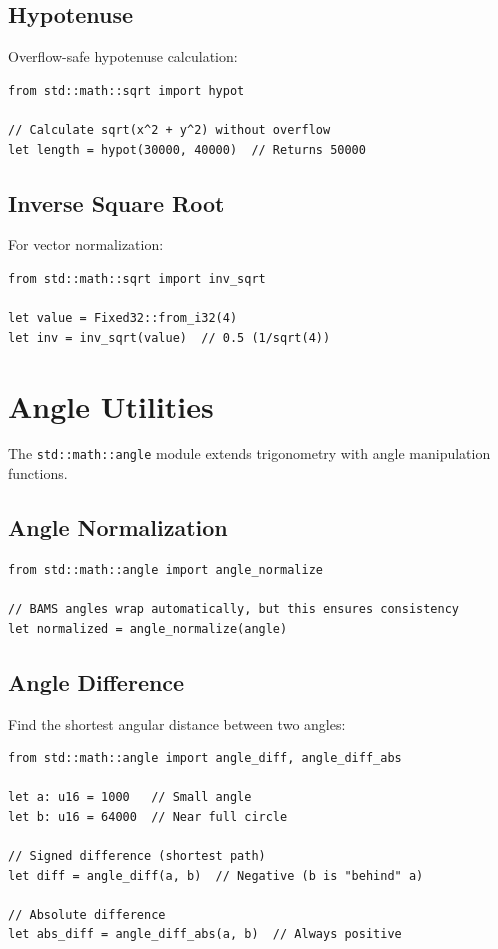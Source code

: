 \subsection{Hypotenuse}

Overflow-safe hypotenuse calculation:

\begin{lstlisting}
from std::math::sqrt import hypot

// Calculate sqrt(x^2 + y^2) without overflow
let length = hypot(30000, 40000)  // Returns 50000
\end{lstlisting}

\subsection{Inverse Square Root}

For vector normalization:

\begin{lstlisting}
from std::math::sqrt import inv_sqrt

let value = Fixed32::from_i32(4)
let inv = inv_sqrt(value)  // 0.5 (1/sqrt(4))
\end{lstlisting}

\section{Angle Utilities}
\label{sec:math-angle}

The \texttt{std::math::angle} module extends trigonometry with angle manipulation functions.

\subsection{Angle Normalization}

\begin{lstlisting}
from std::math::angle import angle_normalize

// BAMS angles wrap automatically, but this ensures consistency
let normalized = angle_normalize(angle)
\end{lstlisting}

\subsection{Angle Difference}

Find the shortest angular distance between two angles:

\begin{lstlisting}
from std::math::angle import angle_diff, angle_diff_abs

let a: u16 = 1000   // Small angle
let b: u16 = 64000  // Near full circle

// Signed difference (shortest path)
let diff = angle_diff(a, b)  // Negative (b is "behind" a)

// Absolute difference
let abs_diff = angle_diff_abs(a, b)  // Always positive
\end{lstlisting}

